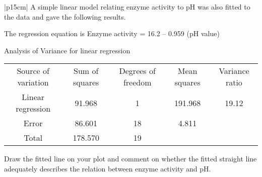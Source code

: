 \documentclass[a4paper,12pt]{article}
\begin{document}
\begin{table}[ht!]
 \centering
 \begin{tabular}{|p{15cm}|}
 \hline  
 A simple linear model relating enzyme activity to pH was also fitted to the data and gave the following results. 
 
  The regression equation is  Enzyme activity  =  16.2 – 0.959 (pH value) 
 
 Analysis of Variance for linear regression 

\begin{center}
\begin{tabular}{|c|c|c|c|c|}
Source of variation&  Sum of squares&  Degrees of freedom &  Mean squares&  Variance ratio \\
Linear regression & 91.968 & 1  & 191.968 &  19.12 \\
Error & 86.601  &18 & 4.811 &  \\
Total & 178.570 & 19& & \\
\end{tabular}
\end{center} 
Draw the fitted line on your plot and comment on whether the fitted straight line adequately describes the relation between enzyme activity and pH.          
\\ \hline
  \end{tabular}
\end{table}
\end{document}
